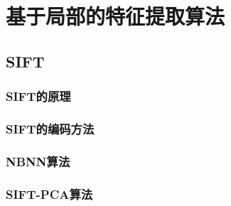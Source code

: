 \chapter{基于局部的特征提取算法}
\section{SIFT}
\subsection{SIFT的原理}
\subsection{SIFT的编码方法}
\subsection{NBNN算法}
\subsection{SIFT-PCA算法}